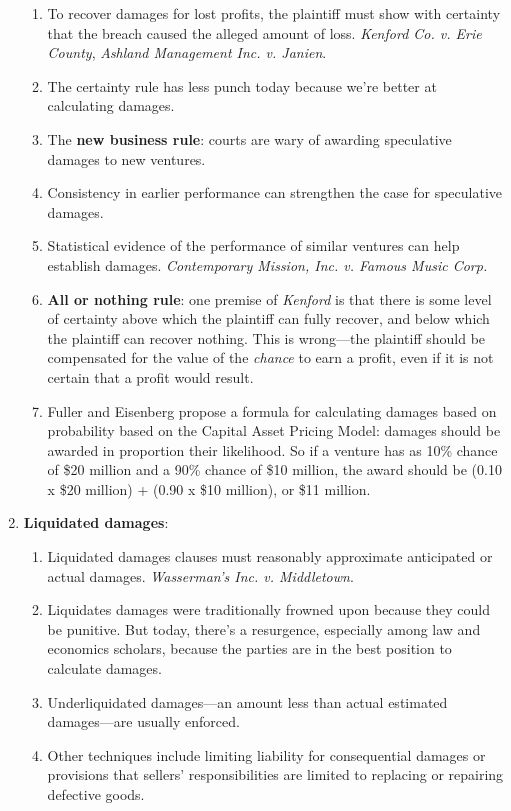 \begin{enumerate}
    \begin{enumerate}
        \item To recover damages for lost profits, the plaintiff must show 
        with certainty that the breach caused the alleged amount of loss. 
        \emph{Kenford Co. v. Erie County}, \emph{Ashland Management Inc. v. 
        Janien}.
        \item The certainty rule has less punch today because we're better at 
        calculating damages.
        \item The \textbf{new business rule}: courts are wary of awarding 
        speculative damages to new ventures.
        \item Consistency in earlier performance can strengthen the case for 
        speculative damages.
        \item Statistical evidence of the performance of similar ventures can 
        help establish damages. \emph{Contemporary Mission, Inc. v. Famous 
        Music Corp.}
        \item \textbf{All or nothing rule}: one premise of \emph{Kenford} is 
        that there is some level of certainty above which the plaintiff can 
        fully recover, and below which the plaintiff can recover nothing. This 
        is wrong---the plaintiff should be compensated for the value of the 
        \emph{chance} to earn a profit, even if it is not certain that a 
        profit would result.
        \item Fuller and Eisenberg propose a formula for calculating damages 
        based on probability based on the Capital Asset Pricing Model: damages 
        should be awarded in proportion their likelihood.  So if a venture has 
        as 10\% chance of \$20 million and a 90\% chance of \$10 million, the 
        award should be (0.10 x \$20 million) + (0.90 x \$10 million), or \$11 
        million.
    \end{enumerate}
    \item \textbf{Liquidated damages}:
    \begin{enumerate}
        \item Liquidated damages clauses must reasonably approximate 
        anticipated or actual damages. \emph{Wasserman's Inc. v. Middletown}.
        \item Liquidates damages were traditionally frowned upon because they 
        could be punitive. But today, there's a resurgence, especially among 
        law and economics scholars, because the parties are in the best 
        position to calculate damages.
        \item Underliquidated damages---an amount less than actual estimated 
        damages---are usually enforced.
        \item Other techniques include limiting liability for consequential 
        damages or provisions that sellers' responsibilities are limited to 
        replacing or repairing defective goods.
    \end{enumerate}
\end{enumerate}

